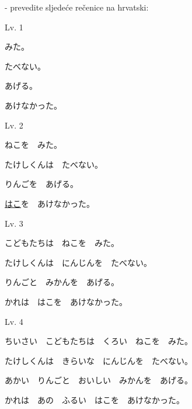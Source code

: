 	
	\begin{reibun}
	\end{reibun}

	 - prevedite sljedeće rečenice na hrvatski:

	\begin{mondai}{Lv. 1}
		\item みた。
		\item たべない。
		\item あげる。
		\item あけなかった。
	\end{mondai}

	\vspace{-10pt}
	\begin{mondai}{Lv. 2}
		\item ねこを　みた。
		\item たけし\footnotemark[4]くんは　たべない。
		\item りんごを　あげる。
		\item \underline{はこ}を　あけなかった。
	\end{mondai}

	\vspace{-10pt}
	\begin{mondai}{Lv. 3}
		\item こどもたちは　ねこを　みた。
		\item たけしくんは　にんじんを　たべない。
		\item りんごと　みかんを　あげる。
		\item かれは　はこを　あけなかった。
	\end{mondai}

	\vspace{-10pt}
	\begin{mondai}{Lv. 4}
		\item ちいさい　こどもたちは　くろい　ねこを　みた。
		\item たけしくんは　きらいな　にんじんを　たべない。
		\item あかい　りんごと　おいしい　みかんを　あげる。
		\item かれは　あの　ふるい　はこを　あけなかった。
	\end{mondai}

